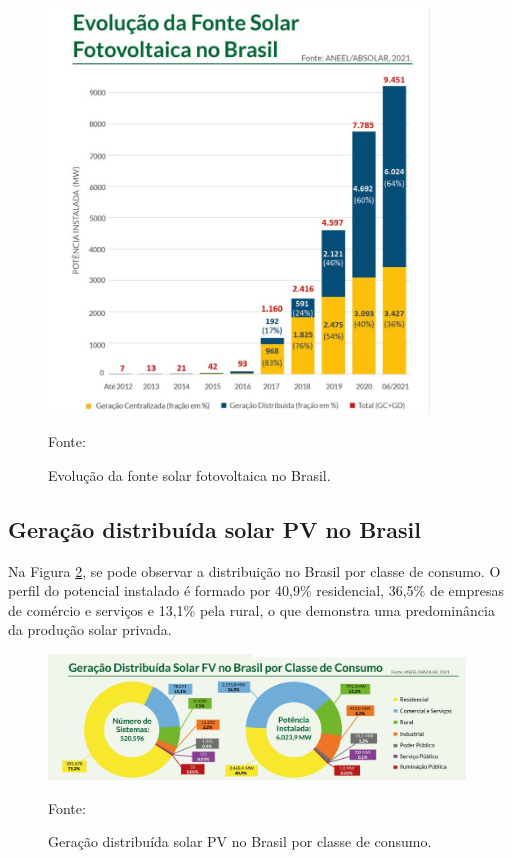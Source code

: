 \begin{figure}[H]
    \centering
    \includegraphics[width=0.9\textwidth]{./Figuras/ev_solar.jpg}
    \caption{Evolução da fonte solar fotovoltaica no Brasil.}{Fonte: \cite{ABSOLAR}}
   \label{fig:ev_solar}
\end{figure}

\subsection{Geração distribuída solar PV no Brasil}

Na Figura \ref{fig:geracao_solar_br}, se pode observar a distribuição no Brasil por classe de consumo. O perfil do potencial instalado é formado por 40,9\% residencial, 36,5\% de empresas de comércio e serviços e 13,1\% pela rural, o que demonstra uma predominância da produção solar privada.

\begin{figure}[H]
    \centering
    \includegraphics[width=0.985\textwidth]{./Figuras/geracao_solar_br.jpg}
    \caption{Geração distribuída solar PV no Brasil por classe de consumo.}{Fonte: \cite{ABSOLAR}}
   \label{fig:geracao_solar_br}
\end{figure}


